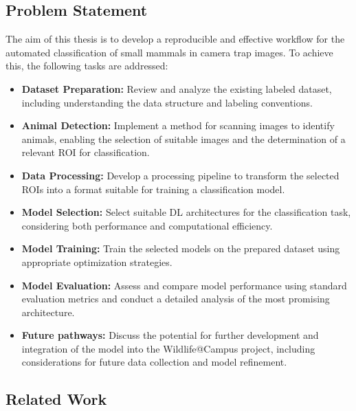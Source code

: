 \subsection{Problem Statement}

The aim of this thesis is to develop a reproducible and effective workflow for the automated classification of small mammals in camera trap images. To achieve this, the following tasks are addressed:

\begin{itemize}
    \item \textbf{Dataset Preparation:} Review and analyze the existing labeled dataset, including understanding the data structure and labeling conventions.
    
    \item \textbf{Animal Detection:} Implement a method for scanning images to identify animals, enabling the selection of suitable images and the determination of a relevant \ac{ROI} for classification.

    \item \textbf{Data Processing:} Develop a processing pipeline to transform the selected \acp{ROI} into a format suitable for training a classification model.
    
    \item \textbf{Model Selection:} Select suitable \ac{DL} architectures for the classification task, considering both performance and computational efficiency.
    
    \item \textbf{Model Training:} Train the selected models on the prepared dataset using appropriate optimization strategies.
    
    \item \textbf{Model Evaluation:} Assess and compare model performance using standard evaluation metrics and conduct a detailed analysis of the most promising architecture.

    \item \textbf{Future pathways:} Discuss the potential for further development and integration of the model into the Wildlife@Campus project, including considerations for future data collection and model refinement.
\end{itemize}


\subsection{Related Work}

